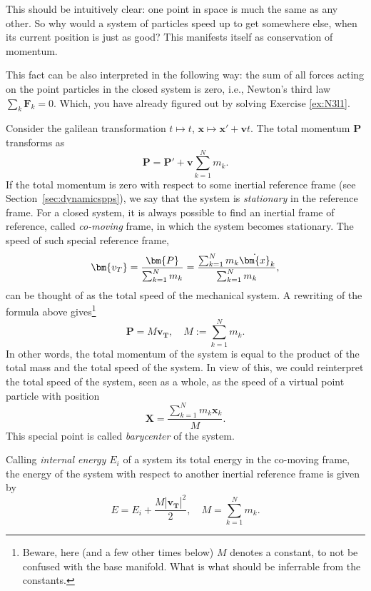 \documentclass[english,fontsize=11pt,paper=a5,oneside]{scrbook}
\newcommand{\bx}{\bm{x}}
\theoremstyle{definition}
\newenvironment{example}
  {\pushQED{\qed}\renewcommand{\qedsymbol}{$\lozenge$}\examplex}
  {\popQED\endexamplex}
\begin{document}
This should be intuitively clear: one point in space is much the same as any other. So why would a system of particles speed up to get somewhere else, when its current position is just as good? This manifests itself as conservation of momentum.

This fact can be also interpreted in the following way: the sum of all forces acting on the point particles in the closed system is zero, i.e., Newton's third law $\sum_k \bm{F}_k = 0$. Which, you have already figured out by solving Exercise \ref{ex:N3l1}.

\begin{example}[The baricenter]
  Consider the galilean transformation $t \mapsto t$, $\bx \mapsto \bx' + \bm{v}t$.
  The total momentum $\bm{P}$ transforms as
  \begin{equation}
    \bm{P} = \bm{P}' + \bm{v}  \sum_{k=1}^N m_k.
  \end{equation}
  If the total momentum is zero with respect to some inertial reference frame (see Section~\ref{sec:dynamicspps}), we say that the system is \emph{stationary} in the reference frame. For a closed system, it is always possible to find an inertial frame of reference, called \emph{co-moving} frame, in which the system becomes stationary. The speed of such special reference frame,
  \begin{equation}
    \bm{v_T} = \frac{\bm{P}}{\sum_{k=1}^N m_k}
    = \frac{\sum_{k=1}^N m_k \dot \bx_k}{\sum_{k=1}^N m_k},
  \end{equation}
  can be thought of as the total speed of the mechanical system.
  A rewriting of the formula above gives\footnote{Beware, here (and a few other times below) $M$ denotes a constant, to not be confused with the base manifold. What is what should be inferrable from the constants.}
  \begin{equation}
    \bm{P} = M \bm{v_T}, \quad M:= \sum_{k=1}^N m_k.
  \end{equation}
  In other words, the total momentum of the system is equal to the product of the total mass and the total speed of the system.
  In view of this, we could reinterpret the total speed of the system, seen as a whole, as the speed of a virtual point particle with position
  \begin{equation}
    \bm{X} = \frac{\sum_{k=1}^N m_k \bx_k}{M}.
  \end{equation}
  This special point is called \emph{barycenter} of the system.
  \medskip

  Calling \emph{internal energy $E_i$} of a system its total energy in the co-moving frame, the energy of the system with respect to another inertial reference frame is given by
  \begin{equation}
    E = E_i + \frac{M |\bm{v_T}|^2}{2}, \quad M= \sum_{k=1}^N m_k.
  \end{equation}
\end{example}
\end{document}
